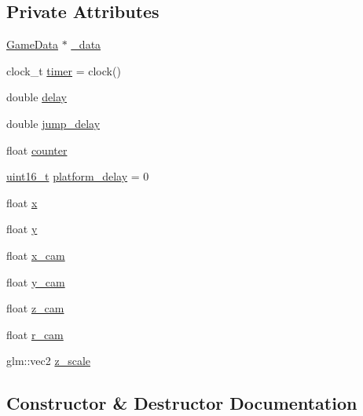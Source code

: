 \subsection*{Private Attributes}
\begin{DoxyCompactItemize}
\item 
\hyperlink{structGameData}{Game\+Data} $\ast$ \hyperlink{classSplashState_af1176a8c13fcd1dc47263064d6b081d5}{\+\_\+data}
\item 
clock\+\_\+t \hyperlink{classSplashState_a403b26122d93bd2b3744e6525ec26671}{timer} = clock()
\item 
double \hyperlink{classSplashState_a109200dcf29852092ded37289f784db2}{delay}
\item 
double \hyperlink{classSplashState_a321b8ee8c87742641b9bfc168ec90d7f}{jump\+\_\+delay}
\item 
float \hyperlink{classSplashState_aef944c31e8600bfa272bfeae2c7a9208}{counter}
\item 
\hyperlink{stdint_8h_a273cf69d639a59973b6019625df33e30}{uint16\+\_\+t} \hyperlink{classSplashState_a4d8f1271f8f62fba1a674bed0c67f950}{platform\+\_\+delay} = 0
\item 
float \hyperlink{classSplashState_ad74688dceca650f340e9113938234547}{x}
\item 
float \hyperlink{classSplashState_a4477fcbed7b631aaf135359a09bb0b3c}{y}
\item 
float \hyperlink{classSplashState_a4264ee844097c44c250a95457aa7da2f}{x\+\_\+cam}
\item 
float \hyperlink{classSplashState_adce1ee0219be0b1045a578c4cae88b3b}{y\+\_\+cam}
\item 
float \hyperlink{classSplashState_a4c2362acca2844d0cbcdc2fc958d68a6}{z\+\_\+cam}
\item 
float \hyperlink{classSplashState_a20b119095bf99299609bf381224624c9}{r\+\_\+cam}
\item 
glm\+::vec2 \hyperlink{classSplashState_aa80fb9876f76790eb989071b213c967f}{z\+\_\+scale}
\end{DoxyCompactItemize}


\subsection{Constructor \& Destructor Documentation}
\mbox{\label{classSplashState_a9aa258fc56874b33de72ea986bceeb62}} 
